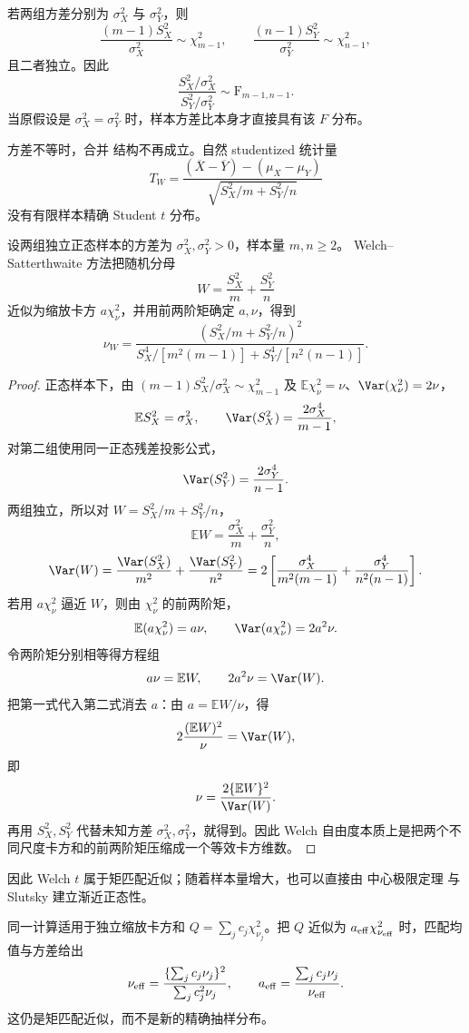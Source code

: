 若两组方差分别为 $\sigma_X^2$ 与 $\sigma_Y^2$，则
\[
 \frac{(m-1)S_X^2}{\sigma_X^2}\sim\chi^2_{m-1},
 \qquad
 \frac{(n-1)S_Y^2}{\sigma_Y^2}\sim\chi^2_{n-1},
\]
且二者独立。因此
\begin{equation*}\frac{S_X^2/\sigma_X^2}{S_Y^2/\sigma_Y^2}
 \sim\mathrm F_{m-1,n-1}.
\end{equation*}
当原假设是 $\sigma_X^2=\sigma_Y^2$ 时，样本方差比本身才直接具有该 $F$ 分布。

方差不等时，合并 结构不再成立。自然 studentized 统计量
\[
 T_W
 =\frac{(\overline X-\overline Y)-(\mu_X-\mu_Y)}
 {\sqrt{S_X^2/m+S_Y^2/n}}
\]
没有有限样本精确 Student $t$ 分布。\begin{proposition}
设两组独立正态样本的方差为 $\sigma_X^2,\sigma_Y^2>0$，样本量 $m,n\ge2$。
Welch--Satterthwaite 方法把随机分母
\[
 W=\frac{S_X^2}{m}+\frac{S_Y^2}{n}
\]
近似为缩放卡方 $a\chi^2_\nu$，并用前两阶矩确定 $a,\nu$，得到
\begin{equation}\label{eq:math-stat-welch-df}
 \nu_W
 =\frac{(S_X^2/m+S_Y^2/n)^2}
 {S_X^4/[m^2(m-1)]+S_Y^4/[n^2(n-1)]}.
\end{equation}
\end{proposition}
\begin{proof}
正态样本下，由 $(m-1)S_X^2/\sigma_X^2\sim\chi^2_{m-1}$ 及 $\mathbb E\chi^2_\nu=\nu$、$\Var(\chi^2_\nu)=2\nu$，
\[
 \mathbb E S_X^2=\sigma_X^2,
 \qquad
 \Var(S_X^2)=\frac{2\sigma_X^4}{m-1},
\]
对第二组使用同一正态残差投影公式，
\[
 \Var(S_Y^2)=\frac{2\sigma_Y^4}{n-1}.
\]
两组独立，所以对 $W=S_X^2/m+S_Y^2/n$，
\[
 \mathbb E W
 =\frac{\sigma_X^2}{m}+\frac{\sigma_Y^2}{n},
\]
\[
 \Var(W)
 =\frac{\Var(S_X^2)}{m^2}+\frac{\Var(S_Y^2)}{n^2}
 =2\left[
 \frac{\sigma_X^4}{m^2(m-1)}
 +\frac{\sigma_Y^4}{n^2(n-1)}
 \right].
\]
若用 $a\chi^2_\nu$ 逼近 $W$，则由 $\chi^2_\nu$ 的前两阶矩，
\[
 \mathbb E(a\chi^2_\nu)=a\nu,
 \qquad
 \Var(a\chi^2_\nu)=2a^2\nu.
\]
令两阶矩分别相等得方程组
\[
a\nu=\mathbb E W,
\qquad
2a^2\nu=\Var(W).
\]
把第一式代入第二式消去 $a$：由 $a=\mathbb E W/\nu$，得
\[
2\frac{(\mathbb E W)^2}{\nu}=\Var(W),
\]
即
\[
 \nu
 =\frac{2\{\mathbb E W\}^2}{\Var(W)}.
\]
再用 $S_X^2,S_Y^2$ 代替未知方差 $\sigma_X^2,\sigma_Y^2$，就得到。因此 Welch 自由度本质上是把两个不同尺度卡方和的前两阶矩压缩成一个等效卡方维数。
\end{proof}
因此 Welch $t$ 属于矩匹配近似；随着样本量增大，也可以直接由 中心极限定理 与 Slutsky 建立渐近正态性。

同一计算适用于独立缩放卡方和 $Q=\sum_j c_j\chi^2_{\nu_j}$。把 $Q$ 近似为 $a_{\rm eff}\chi^2_{\nu_{\rm eff}}$ 时，匹配均值与方差给出
\[
\nu_{\rm eff}
=\frac{\{\sum_j c_j\nu_j\}^2}{\sum_j c_j^2\nu_j},
\qquad
a_{\rm eff}=\frac{\sum_j c_j\nu_j}{\nu_{\rm eff}}.
\]
这仍是矩匹配近似，而不是新的精确抽样分布。

